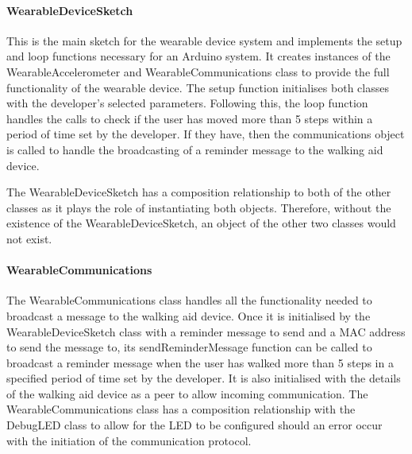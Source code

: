                 \clearpage
                \thispagestyle{empty}
                \begin{landscape}
                    
                \end{landscape}

                \paragraph{WearableDeviceSketch}\mbox{}

                    This is the main sketch for the wearable device system and implements the setup and loop functions necessary for an Arduino system. It creates instances of the WearableAccelerometer and WearableCommunications class to provide the full functionality of the wearable device. The setup function initialises both classes with the developer's selected parameters. Following this, the loop function handles the calls to check if the user has moved more than 5 steps within a period of time set by the developer. If they have, then the communications object is called to handle the broadcasting of a reminder message to the walking aid device.

                    The WearableDeviceSketch has a composition relationship to both of the other classes as it plays the role of instantiating both objects. Therefore, without the existence of the WearableDeviceSketch, an object of the other two classes would not exist.

                \paragraph{WearableCommunications}\mbox{}

                    The WearableCommunications class handles all the functionality needed to broadcast a message to the walking aid device. Once it is initialised by the WearableDeviceSketch class with a reminder message to send and a MAC address to send the message to, its sendReminderMessage function can be called to broadcast a reminder message when the user has walked more than 5 steps in a specified period of time set by the developer. It is also initialised with the details of the walking aid device as a peer to allow incoming communication. The WearableCommunications class has a composition relationship with the DebugLED class to allow for the LED to be configured should an error occur with the initiation of the communication protocol.

